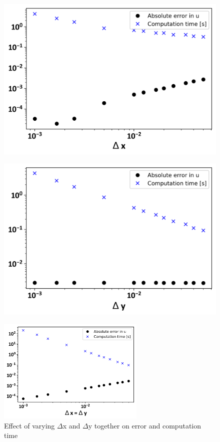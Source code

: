 \documentclass[10pt]{article}
\begin{document}
\begin{figure}[H]
\centering
\begin{minipage}{.49\textwidth}
  \centering
  \includegraphics[width=.87\linewidth]{dxEffect.png}
  \captionsetup{width=.95\linewidth}
  \label{dxEffect}
\end{minipage}
\begin{minipage}{.49\textwidth}
  \centering
  \includegraphics[width=.87\linewidth]{dyEffect.png}
  \captionsetup{width=.95\linewidth}
  \label{dyEffect}
\end{minipage}
\end{figure}

\begin{figure}[H]
	\begin{center}
		\includegraphics[width=7cm]{dxdyEffect.png}
  		\caption{Effect of varying $\Delta$x and $\Delta$y together on error and computation time}
  		\label{dxdyEffect}
	\end{center}
\end{figure}
\end{document}
